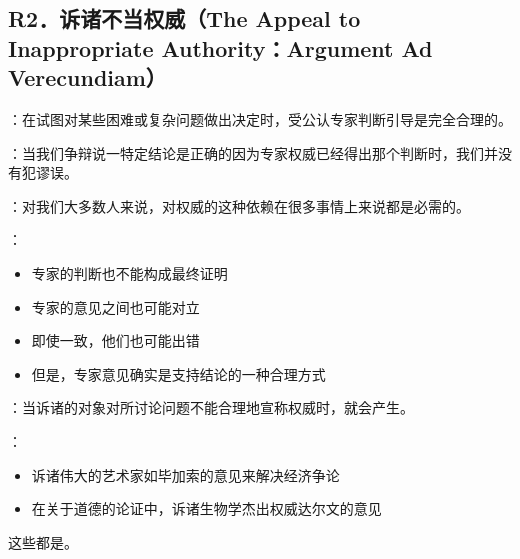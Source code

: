 \subsection{R2．诉诸不当权威（The Appeal to Inappropriate Authority：Argument Ad Verecundiam）}

\begin{theorembox}[title=权威诉诸的合理性]
：在试图对某些困难或复杂问题做出决定时，受公认专家判断引导是完全合理的。

：当我们争辩说一特定结论是正确的因为专家权威已经得出那个判断时，我们并没有犯谬误。

：对我们大多数人来说，对权威的这种依赖在很多事情上来说都是必需的。

：
\begin{itemize}
  \item 专家的判断也不能构成最终证明
  \item 专家的意见之间也可能对立
  \item 即使一致，他们也可能出错
  \item 但是，专家意见确实是支持结论的一种合理方式
\end{itemize}
\end{theorembox}

\begin{theorembox}[title=诉诸不当权威谬误的定义]
：当诉诸的对象对所讨论问题不能合理地宣称权威时，就会产生。

：
\begin{itemize}
  \item 诉诸伟大的艺术家如毕加索的意见来解决经济争论
  \item 在关于道德的论证中，诉诸生物学杰出权威达尔文的意见
\end{itemize}

这些都是。
\end{theorembox}

